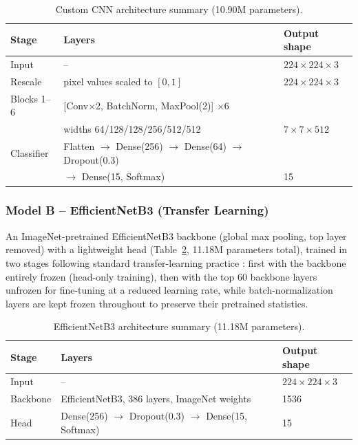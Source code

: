 \documentclass[12pt,a4paper]{article}
\begin{document}
\begin{table}[H]
\centering
\caption{Custom CNN architecture summary (10.90M parameters).}
\begin{tabular}{@{}lll@{}}
\toprule
\textbf{Stage} & \textbf{Layers} & \textbf{Output shape} \\
\midrule
Input & -- & $224\times224\times3$ \\
Rescale & pixel values scaled to $[0,1]$ & $224\times224\times3$ \\
Blocks 1--6 & [Conv$\times$2, BatchNorm, MaxPool(2)] $\times$6 & \\
& widths 64/128/128/256/512/512 & $7\times7\times512$ \\
Classifier & Flatten $\to$ Dense(256) $\to$ Dense(64) $\to$ Dropout(0.3) & \\
& $\to$ Dense(15, Softmax) & 15 \\
\bottomrule
\end{tabular}
\label{tab:cnnarch}
\end{table}

\subsubsection{Model B -- EfficientNetB3 (Transfer Learning)}
An ImageNet-pretrained EfficientNetB3 backbone \cite{tan2019efficientnet}
(global max pooling, top layer removed) with a lightweight head
(Table~\ref{tab:effnetarch}, 11.18M parameters total), trained in two stages
following standard transfer-learning practice \cite{pan2010transfer}: first
with the backbone entirely frozen (head-only training), then with the top 60
backbone layers unfrozen for fine-tuning at a reduced learning rate, while
batch-normalization layers are kept frozen throughout to preserve their
pretrained statistics.

\begin{table}[H]
\centering
\caption{EfficientNetB3 architecture summary (11.18M parameters).}
\begin{tabular}{@{}lll@{}}
\toprule
\textbf{Stage} & \textbf{Layers} & \textbf{Output shape} \\
\midrule
Input & -- & $224\times224\times3$ \\
Backbone & EfficientNetB3, 386 layers, ImageNet weights & 1536 \\
Head & Dense(256) $\to$ Dropout(0.3) $\to$ Dense(15, Softmax) & 15 \\
\bottomrule
\end{tabular}
\label{tab:effnetarch}
\end{table}
\end{document}
